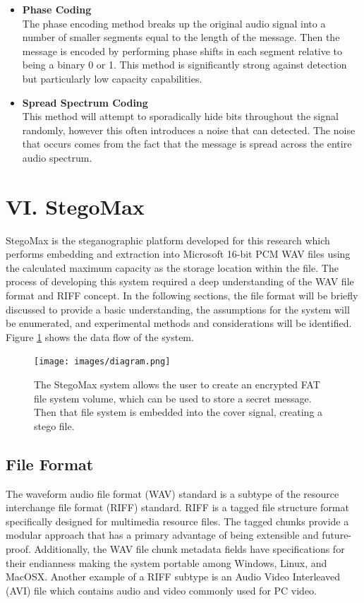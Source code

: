 \documentclass[letterpaper]{article}
\begin{document}
\begin{itemize}
\item \textbf{Phase Coding}\\
The phase encoding method breaks up the original audio signal into a number of smaller segments equal to the length of the message. Then the message is encoded by performing phase shifts in each segment relative to being a binary 0 or 1. This method is significantly strong against detection but particularly low capacity capabilities. 

\item \textbf{Spread Spectrum Coding}\\
This method will attempt to sporadically hide bits throughout the signal randomly, however this often introduces a noise that can detected. The noise that occurs comes from the fact that the message is spread across the entire audio spectrum.   

\end{itemize}





\section{VI. StegoMax}
StegoMax is the steganographic platform developed for this research which performs embedding and extraction into Microsoft 16-bit PCM WAV files using the calculated maximum capacity as the storage location within the file. The process of developing this system required a deep understanding of the WAV file format and RIFF concept. In the following sections, the file format will be briefly discussed to provide a basic understanding, the assumptions for the system will be enumerated, and experimental methods and considerations will be identified. Figure \ref{fig:diagram} shows the data flow of the system.

\begin{figure}[h]
    \centering
    \texttt{[image: images/diagram.png]}
    \caption{The StegoMax system allows the user to create an encrypted FAT file system volume, which can be used to store a secret message. Then that file system is embedded into the cover signal, creating a stego file.}
    \label{fig:diagram}
 
\end{figure}

\subsection{File Format}
The waveform audio file format (WAV) standard is a subtype of the resource interchange file format (RIFF) standard. RIFF is a tagged file structure format specifically designed for multimedia resource files. The tagged chunks provide a modular approach that has a primary advantage of being extensible and future-proof.\cite{riffspec} Additionally, the WAV file chunk metadata fields have specifications for their endianness making the system portable among Windows, Linux, and MacOSX. Another example of a RIFF subtype is an Audio Video Interleaved (AVI) file which contains audio and video commonly used for PC video.  
\end{document}
